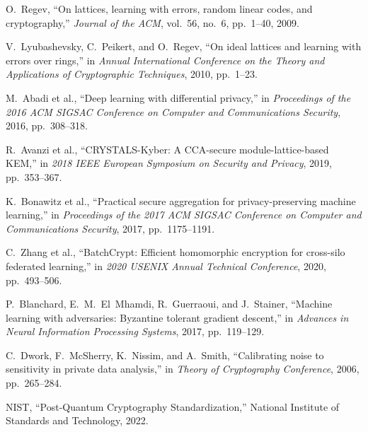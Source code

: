 \documentclass[journal]{IEEEtran}
\begin{document}
\begin{thebibliography}{9}

O.~Regev, ``On lattices, learning with errors, random linear codes, and cryptography,'' \emph{Journal of the ACM}, vol.~56, no.~6, pp.~1--40, 2009.

V.~Lyubashevsky, C.~Peikert, and O.~Regev, ``On ideal lattices and learning with errors over rings,'' in \emph{Annual International Conference on the Theory and Applications of Cryptographic Techniques}, 2010, pp.~1--23.

M.~Abadi et al., ``Deep learning with differential privacy,'' in \emph{Proceedings of the 2016 ACM SIGSAC Conference on Computer and Communications Security}, 2016, pp.~308--318.

R.~Avanzi et al., ``CRYSTALS-Kyber: A CCA-secure module-lattice-based KEM,'' in \emph{2018 IEEE European Symposium on Security and Privacy}, 2019, pp.~353--367.

K.~Bonawitz et al., ``Practical secure aggregation for privacy-preserving machine learning,'' in \emph{Proceedings of the 2017 ACM SIGSAC Conference on Computer and Communications Security}, 2017, pp.~1175--1191.

C.~Zhang et al., ``BatchCrypt: Efficient homomorphic encryption for cross-silo federated learning,'' in \emph{2020 USENIX Annual Technical Conference}, 2020, pp.~493--506.

P.~Blanchard, E.~M.~El~Mhamdi, R.~Guerraoui, and J.~Stainer, ``Machine learning with adversaries: Byzantine tolerant gradient descent,'' in \emph{Advances in Neural Information Processing Systems}, 2017, pp.~119--129.

C.~Dwork, F.~McSherry, K.~Nissim, and A.~Smith, ``Calibrating noise to sensitivity in private data analysis,'' in \emph{Theory of Cryptography Conference}, 2006, pp.~265--284.

NIST, ``Post-Quantum Cryptography Standardization,'' National Institute of Standards and Technology, 2022.

\end{thebibliography}
\end{document}
